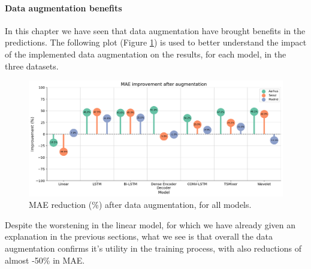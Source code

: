 \paragraph{Data augmentation benefits}

In this chapter we have seen that data augmentation have brought benefits in the predictions. The following plot (Figure \ref{fig:augmentation-improv}) is used to better understand the impact of the implemented data augmentation on the results, for each model, in the three datasets.

\begin{figure}[h]
    \centering
    \includegraphics[width=1\linewidth]{images/improvement with augmentation.png}
    \caption{MAE reduction (\%) after data augmentation, for all models.}
    \label{fig:augmentation-improv}
\end{figure}

Despite the worstening in the linear model, for which we have already given an explanation in the previous sections, what we see is that overall the data augmentation confirms it's utility in the training process, with also reductions of almost -50\% in MAE. 








